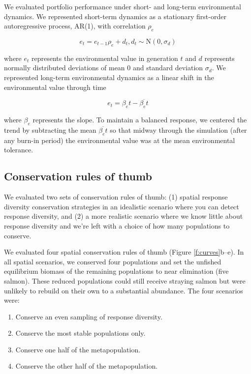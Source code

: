 We evaluated portfolio performance under short- and long-term
environmental dynamics. We represented short-term dynamics as a
stationary first-order autoregressive process, AR(1), with correlation
$\rho_e$

\begin{equation}
  e_t = e_{t-1} \rho_e + d_t, d_t \sim \mathrm{N}(0, \sigma_d)
\end{equation}

\noindent where $e_t$ represents the environmental value in generation
$t$ and $d$ represents normally distributed deviations of mean 0 and
standard deviation $\sigma_d$. We represented long-term environmental
dynamics as a linear shift in the environmental value through time

\begin{equation}
  e_t = \beta_e t - \overline{\beta_e t}
\end{equation}

\noindent where $\beta_e$ represents the slope. To maintain a balanced
response, we centered the trend by subtracting the mean
$\overline{\beta_e t}$ so that midway through the simulation (after any
burn-in period) the environmental value was at the mean environmental
tolerance.

\subsection{Conservation rules of thumb}

We evaluated two sets of conservation rules of thumb: (1) spatial
response diversity conservation strategies in an idealistic scenario
where you can detect response diversity, and (2) a more realistic
scenario where we know little about response diversity and we're left
with a choice of how many populations to conserve.

We evaluated four spatial conservation rules of thumb (Figure
\ref{f:curves}b--e). In all spatial scenarios, we conserved four
populations and set the unfished equilibrium biomass of the remaining
populations to near elimination (five salmon). These reduced populations
could still receive straying salmon but were unlikely to rebuild on
their own to a substantial abundance. The four scenarios were:

\begin{enumerate}
\def\labelenumi{\arabic{enumi}.}
\itemsep1pt\parskip0pt
\item
  Conserve an even sampling of response diversity.
\item
  Conserve the most stable populations only.
\item
  Conserve one half of the metapopulation.
\item
  Conserve the other half of the metapopulation.
\end{enumerate}

